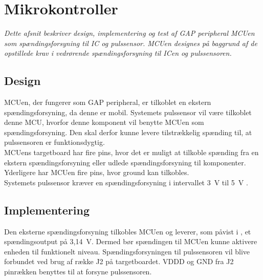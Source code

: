 \section{Mikrokontroller}
\textit{Dette afsnit beskriver design, implementering og test af GAP peripheral MCUen som spændingsforsyning til IC og pulssensor. MCUen designes på baggrund af de opstillede krav i  vedrørende spændingsforsyning til ICen og pulssensoren.}


\subsection{Design}
MCUen, der fungerer som GAP peripheral, er tilkoblet en ekstern spændingsforsyning, da denne er mobil. Systemets pulssensor vil være tilkoblet denne MCU, hvorfor denne komponent vil benytte MCUen som spændingsforsyning. Den skal derfor kunne levere tilstrækkelig spænding til, at pulssensoren er funktionsdygtig. \\
MCUens targetboard har fire pins, hvor det er muligt at tilkoble spænding fra en ekstern spændingsforsyning eller udlede spændingsforsyning til komponenter. Yderligere har MCUen fire pins, hvor ground kan tilkobles. \citep{Semiconductor2016} \\
Systemets pulssensor kræver en spændingsforsyning i intervallet 3~V til 5~V \citep{Murphy2016}.

\subsection{Implementering}
Den eksterne spændingsforsyning tilkobles MCUen og leverer, som påvist i , et spændingsoutput på 3,14~V. Dermed bør spændingen til MCUen kunne aktivere enheden til funktionelt niveau. %
Spændingsforsyningen til pulssensoren vil blive forbundet ved brug af række J2 på targetboardet. VDDD og GND fra J2 pinrækken benyttes til at forsyne pulssensoren.

